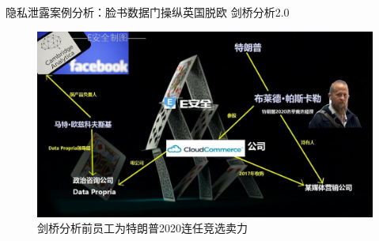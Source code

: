 \documentclass[11pt]{beamer}
\begin{document}
\begin{frame}[allowframebreaks]{隐私泄露案例分析：脸书数据门操纵英国脱欧}
    剑桥分析2.0
    \begin{figure}
    \includegraphics[width=0.6\linewidth]{figures/privacy/ca2}
    \caption{剑桥分析前员工为特朗普2020连任竞选卖力}
    \end{figure}

\end{frame}
\end{document}
